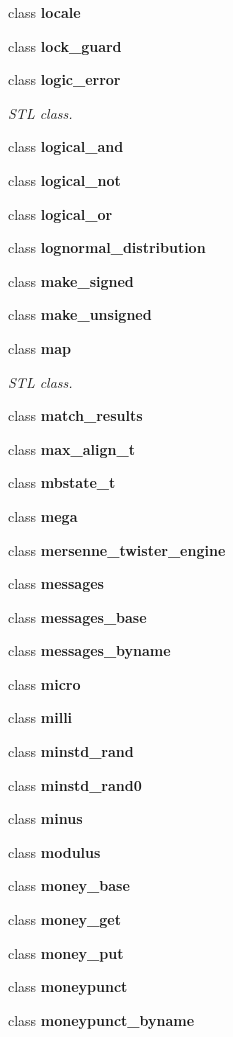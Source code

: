 \begin{DoxyCompactItemize}
class \textbf{ locale}
\item 
class \textbf{ lock\+\_\+guard}
\item 
class \textbf{ logic\+\_\+error}
\begin{DoxyCompactList}\small\item\em S\+TL class. \end{DoxyCompactList}\item 
class \textbf{ logical\+\_\+and}
\item 
class \textbf{ logical\+\_\+not}
\item 
class \textbf{ logical\+\_\+or}
\item 
class \textbf{ lognormal\+\_\+distribution}
\item 
class \textbf{ make\+\_\+signed}
\item 
class \textbf{ make\+\_\+unsigned}
\item 
class \textbf{ map}
\begin{DoxyCompactList}\small\item\em S\+TL class. \end{DoxyCompactList}\item 
class \textbf{ match\+\_\+results}
\item 
class \textbf{ max\+\_\+align\+\_\+t}
\item 
class \textbf{ mbstate\+\_\+t}
\item 
class \textbf{ mega}
\item 
class \textbf{ mersenne\+\_\+twister\+\_\+engine}
\item 
class \textbf{ messages}
\item 
class \textbf{ messages\+\_\+base}
\item 
class \textbf{ messages\+\_\+byname}
\item 
class \textbf{ micro}
\item 
class \textbf{ milli}
\item 
class \textbf{ minstd\+\_\+rand}
\item 
class \textbf{ minstd\+\_\+rand0}
\item 
class \textbf{ minus}
\item 
class \textbf{ modulus}
\item 
class \textbf{ money\+\_\+base}
\item 
class \textbf{ money\+\_\+get}
\item 
class \textbf{ money\+\_\+put}
\item 
class \textbf{ moneypunct}
\item 
class \textbf{ moneypunct\+\_\+byname}

\end{DoxyCompactItemize}
